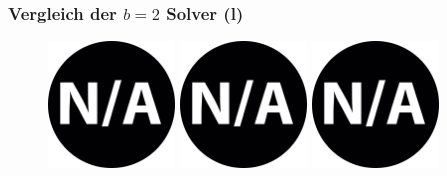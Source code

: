 \documentclass{beamer}
\begin{document}
\begin{frame}
\frametitle{Vergleich der $b = 2$ Solver (l)}

\begin{figure}
\centering
\includegraphics[width=0.3\textwidth]{images/na.png}
\includegraphics[width=0.3\textwidth]{images/na.png}
\includegraphics[width=0.3\textwidth]{images/na.png}
\caption*{\textsc{Zeitlimit 30min} $\quad\quad\quad$ \textsc{Zeitlimit 45min} $\quad\quad\quad$ \textsc{Zeitlimit 60min}}
\begin{subfigure}[b]{0.3\textwidth}
\centering
{}
\end{subfigure}

\end{figure}
\end{frame}
\end{document}
